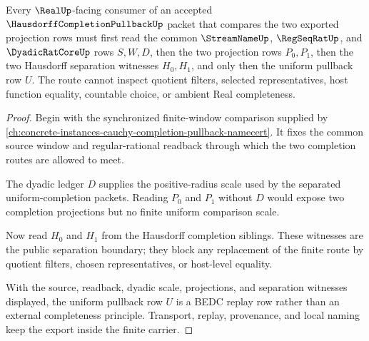 \begin{theorem}
\label{thm:hausdorff-completion-pullback-uniform-route}
Every $\RealUp$-facing consumer of an accepted $\HausdorffCompletionPullbackUp$ packet that compares the two exported projection rows must first read the common $\StreamNameUp$, $\RegSeqRatUp$, and $\DyadicRatCoreUp$ rows $S,W,D$, then the two projection rows $P_0,P_1$, then the two Hausdorff separation witnesses $H_0,H_1$, and only then the uniform pullback row $U$. The route cannot inspect quotient filters, selected representatives, host function equality, countable choice, or ambient Real completeness.
\end{theorem}
\begin{proof}
Begin with the synchronized finite-window comparison supplied by \autoref{ch:concrete-instances-cauchy-completion-pullback-namecert}. It fixes the common source window and regular-rational readback through which the two completion routes are allowed to meet.

The dyadic ledger $D$ supplies the positive-radius scale used by the separated uniform-completion packets. Reading $P_0$ and $P_1$ without $D$ would expose two completion projections but no finite uniform comparison scale.

Now read $H_0$ and $H_1$ from the Hausdorff completion siblings. These witnesses are the public separation boundary; they block any replacement of the finite route by quotient filters, chosen representatives, or host-level equality.

With the source, readback, dyadic scale, projections, and separation witnesses displayed, the uniform pullback row $U$ is a BEDC replay row rather than an external completeness principle. Transport, replay, provenance, and local naming keep the export inside the finite carrier.
\end{proof}



